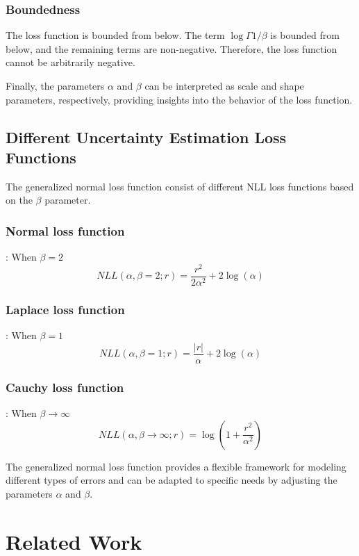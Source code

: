 \documentclass[letterpaper, 10 pt, conference]{ieeeconf}  %
\begin{document}
\subsubsection{Boundedness}
The loss function is bounded from below. The term $\log \Gamma{1/\beta}$ is bounded from below, and the remaining terms are non-negative. Therefore, the loss function cannot be arbitrarily negative.

Finally, the parameters $\alpha$ and $\beta$ can be interpreted as scale and shape parameters, respectively, providing insights into the behavior of the loss function.

\subsection{Different Uncertainty Estimation Loss Functions}
The generalized normal loss function consist of different NLL loss functions based on the $\beta$ parameter.
\subsubsection{Normal loss function}: When $\beta = 2$
\begin{equation*}
    NLL(\alpha, \beta=2; r) = \frac{r^2}{2\alpha^2} + 2\log{(\alpha)}
\end{equation*}
\subsubsection{Laplace loss function}: When $\beta = 1$
\begin{equation*}
     NLL(\alpha, \beta=1; r)  = \frac{|r|}{\alpha} + 2\log{(\alpha)}
\end{equation*}

\subsubsection{Cauchy loss function}: When $ {\beta \to \infty} $
\begin{equation*}
   NLL(\alpha, \beta \to \infty ; r) = \log \left( 1 + \frac{r^2}{\alpha^2} \right)
\end{equation*}

The generalized normal loss function provides a flexible framework for modeling different types of errors and can be adapted to specific needs by adjusting the parameters $\alpha$ and $\beta$.

\section{Related Work}
\label{sec:relatedwork}
\end{document}
